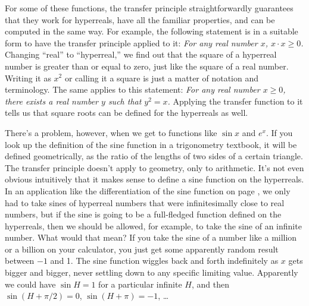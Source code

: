 For some of these functions, the transfer principle straightforwardly guarantees that they work
for hyperreals, have all the familiar properties, and can be computed in the same way. For example,
the following statement is in a suitable form to have the transfer principle applied to it:
\emph{
  For any real number $x$, $x\cdot x \ge0$.
}
Changing ``real'' to ``hyperreal,'' we find out that the square of a hyperreal number is
greater than or equal to zero, just like the square of a real number. Writing it as $x^2$ or
calling it a square is just a matter of notation and terminology.
The same applies to this statement:
\emph{
  For any real number $x\ge 0$, there exists a real number $y$ such that $y^2=x$.
}
Applying the transfer function to it tells us that square roots can be defined for
the hyperreals as well.

There's a problem, however, when we get to functions like $\sin x$ and $e^x$.
If you look up the definition of the sine function in a trigonometry textbook, it will
be defined geometrically, as the ratio of the lengths of two sides of a certain triangle.
The transfer principle doesn't apply to geometry, only to arithmetic. It's not even obvious
intuitively that it makes sense to define a sine function on the hyperreals. In an
application like the differentiation of the sine function on page \pageref{eg:derivative-of-sin},
we only had to take sines of hyperreal numbers that were infinitesimally close to real numbers,
but if the sine is going to be a full-fledged function defined on the hyperreals, then we should
be allowed, for example, to take the sine of an infinite number. What would that mean? If you
take the sine of a number like a million or a billion on your calculator, you just get some
apparently random result between $-1$ and 1. The sine function wiggles back and forth indefinitely
as $x$ gets bigger and bigger, never settling down to any specific limiting value. Apparently
we could have $\sin H=1$ for a particular infinite $H$, and then $\sin (H+\pi/2)=0$, $\sin(H+\pi)=-1$, \ldots

